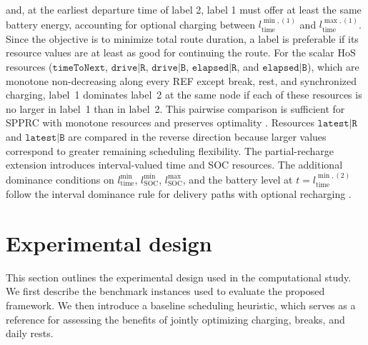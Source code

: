 \documentclass[3p,11pt,authoryear]{elsarticle}  %
\begin{document}
and, at the earliest departure time of label 2, label 1 must offer at least the same battery energy, accounting for optional charging between $l_{\text{time}}^{\min,(1)}$ and $l_{\text{time}}^{\max,(1)}$.  Since the objective is to minimize total route duration, a label is preferable if its resource values are at least as good for continuing the route. For the scalar HoS resources ($\texttt{timeToNext}$, $\texttt{drive|R}$, $\texttt{drive|B}$,
$\texttt{elapsed|R}$, and $\texttt{elapsed|B}$), which are monotone non-decreasing along every REF except break, rest, and synchronized charging, label~1 dominates label~2 at the same node if each of these resources is no
larger in label~1 than in label~2. This pairwise comparison is sufficient for SPPRC with monotone resources and
preserves optimality \citep{irnich2005shortest, goel2017exact}. Resources $\texttt{latest|R}$ and $\texttt{latest|B}$ are compared in the reverse direction because larger values correspond to greater remaining scheduling flexibility. The partial-recharge extension introduces interval-valued time and SOC resources. The additional dominance conditions on $l_{\text{time}}^{\min}$, $l_{\text{SOC}}^{\min}$, $l_{\text{SOC}}^{\max}$, and the battery level at $t=l_{\text{time}}^{\min,(2)}$ follow the interval dominance rule for delivery paths with optional recharging
\citep{desaulniers2016exact}.





    
    
    \section{Experimental design} %
    


This section outlines the experimental design used in the computational study. We first describe the benchmark instances used to evaluate the proposed framework. We then introduce a baseline scheduling heuristic, which serves as a reference for assessing the benefits of jointly optimizing charging, breaks, and daily rests.
\end{document}

